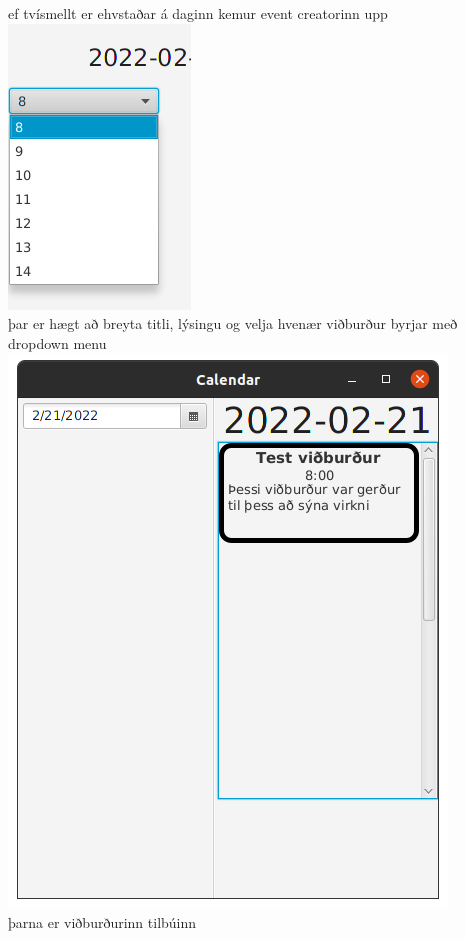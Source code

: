 \documentclass{article}
\begin{document}
\begin{center}
    ef tvísmellt er ehvstaðar á daginn kemur event creatorinn upp\\
    \includegraphics[scale=0.3]{imgs/s5.png}\\
    þar er hægt að breyta titli, lýsingu og velja hvenær viðburður byrjar með dropdown menu\\
    \includegraphics[scale=0.3]{imgs/s6.png}\\
    þarna er viðburðurinn tilbúinn\\

\end{center}
\end{document}
